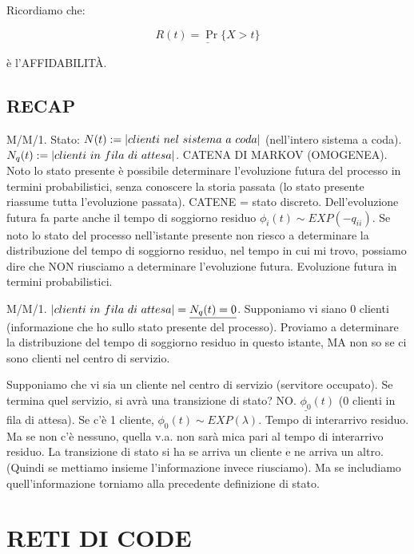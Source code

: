 Ricordiamo che:

\[
	\underline{R(t) = \Pr\{X > t\}}
\]

è l'AFFIDABILIT\`A.

\subsection{RECAP}

M/M/1. Stato: $N(t) := \left\vert{clienti\ nel\ sistema\ a\ coda}\right\vert$ (nell'intero sistema a coda). $N_q(t) := \left\vert{clienti\ in\ fila\ di\ attesa}\right\vert$. CATENA DI MARKOV (OMOGENEA). Noto lo stato presente è possibile determinare l'evoluzione futura del processo in termini probabilistici, senza conoscere la storia passata (lo stato presente riassume tutta l'evoluzione passata). CATENE = stato discreto. Dell'evoluzione futura fa parte anche il tempo di soggiorno residuo $\phi_i(t) \sim EXP(-q_{ii})$. Se noto lo stato del processo nell'istante presente non riesco a determinare la distribuzione del tempo di soggiorno residuo, nel tempo in cui mi trovo, possiamo dire che NON riusciamo a determinare l'evoluzione futura. Evoluzione futura in termini probabilistici.

M/M/1. $\cardinality{clienti\ in\ fila\ di\ attesa}=\underline{N_q(t) = 0}$. Supponiamo vi siano 0 clienti (informazione che ho sullo stato presente del processo). Proviamo a determinare la distribuzione del tempo di soggiorno residuo in questo istante, MA non so se ci sono clienti nel centro di servizio. 

Supponiamo che vi sia un cliente nel centro di servizio (servitore occupato). Se termina quel servizio, si avrà una transizione di stato? NO. $\underline{\phi_0}(t)$ (0 clienti in fila di attesa). Se c'è 1 cliente, $\phi_0(t)\sim EXP(\lambda)$. Tempo di interarrivo residuo. Ma se non c'è nessuno, quella v.a. non sarà mica pari al tempo di interarrivo residuo. La transizione di stato si ha se arriva un cliente e ne arriva un altro. (Quindi se mettiamo insieme l'informazione invece riusciamo). Ma se includiamo quell'informazione torniamo alla precedente definizione di stato.

\section{RETI DI CODE}

